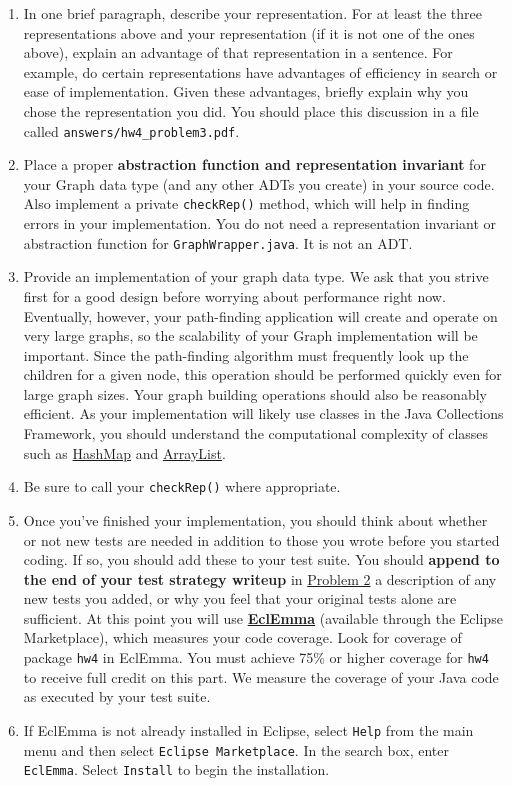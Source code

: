 \documentclass[11pt]{article}
\begin{document}
\begin{enumerate}
\item In one brief paragraph, describe your representation. For at least the three representations above and your representation (if it is not one of the ones above), explain an advantage of that representation in a sentence. For example, do certain representations have advantages of efficiency in search or ease of implementation. Given these advantages, briefly explain why you chose the representation you did. You should place this discussion in a file called \texttt{answers/hw4\_problem3.pdf}.
\newpage

\item Place a proper \textbf{abstraction function and representation invariant} for your Graph data type (and any other ADTs you create) in your source code. Also implement a private \texttt{checkRep()} method, which will help in finding errors in your implementation. You do not need a representation invariant or abstraction function for \texttt{GraphWrapper.java}. It is not an ADT.
\item Provide an implementation of your graph data type. We ask that you strive first for a good design before worrying about performance right now. Eventually, however, your path-finding application will create and operate on very large graphs, so the scalability of your Graph implementation will be important. Since the path-finding algorithm must frequently look up the children for a given node, this operation should be performed quickly even for large graph sizes. Your graph building operations should also be reasonably efficient. As your implementation will likely use classes in the Java Collections Framework, you should understand the computational complexity of classes such as \href{https://docs.oracle.com/javase/8/docs/api/java/util/HashMap.html}{HashMap} and \href{http://docs.oracle.com/javase/8/docs/api/java/util/ArrayList.html}{ArrayList}.
\item Be sure to call your \texttt{checkRep()} where appropriate.
\item
Once you've finished your implementation, you should think about whether or not new tests are needed in addition to those you wrote before you started coding. If so, you should add these to your test suite. You should \textbf{append to the end of your test strategy writeup} in \hyperref[sec:Problem 2]{Problem 2} a description of any new tests you added, or why you feel that your original tests alone are sufficient. At this point you will use \href{http://www.eclemma.org/}{\textbf{EclEmma}} (available through the Eclipse Marketplace), which measures your code coverage. Look for coverage of package \texttt{hw4} in EclEmma. You must achieve 75\% or higher coverage for \texttt{hw4} to receive full credit on this part. We measure the coverage of your Java code as executed by your test suite.
\item
If EclEmma is not already installed in Eclipse, select \texttt{Help} from the main menu and then select \texttt{Eclipse Marketplace}. In the search box, enter \texttt{EclEmma}. Select \texttt{Install} to begin the installation.
\end{enumerate}
\end{document}
